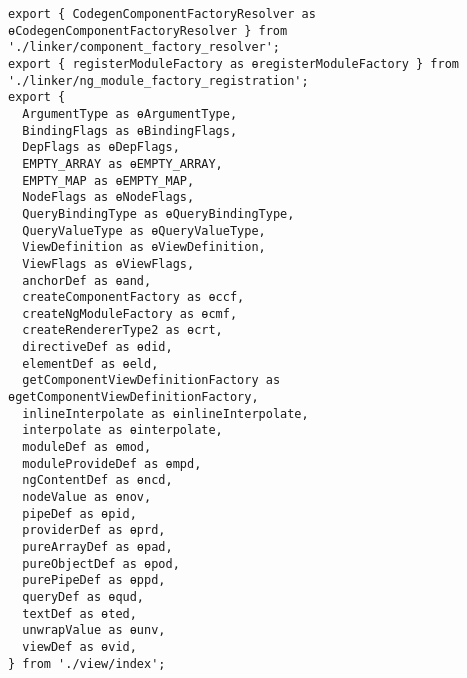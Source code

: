 \begin{verbatim}
export { CodegenComponentFactoryResolver as ɵCodegenComponentFactoryResolver } from './linker/component_factory_resolver';
export { registerModuleFactory as ɵregisterModuleFactory } from './linker/ng_module_factory_registration';
export {
  ArgumentType as ɵArgumentType,
  BindingFlags as ɵBindingFlags,
  DepFlags as ɵDepFlags,
  EMPTY_ARRAY as ɵEMPTY_ARRAY,
  EMPTY_MAP as ɵEMPTY_MAP,
  NodeFlags as ɵNodeFlags,
  QueryBindingType as ɵQueryBindingType,
  QueryValueType as ɵQueryValueType,
  ViewDefinition as ɵViewDefinition,
  ViewFlags as ɵViewFlags,
  anchorDef as ɵand,
  createComponentFactory as ɵccf,
  createNgModuleFactory as ɵcmf,
  createRendererType2 as ɵcrt,
  directiveDef as ɵdid,
  elementDef as ɵeld,
  getComponentViewDefinitionFactory as ɵgetComponentViewDefinitionFactory,
  inlineInterpolate as ɵinlineInterpolate,
  interpolate as ɵinterpolate,
  moduleDef as ɵmod,
  moduleProvideDef as ɵmpd,
  ngContentDef as ɵncd,
  nodeValue as ɵnov,
  pipeDef as ɵpid,
  providerDef as ɵprd,
  pureArrayDef as ɵpad,
  pureObjectDef as ɵpod,
  purePipeDef as ɵppd,
  queryDef as ɵqud,
  textDef as ɵted,
  unwrapValue as ɵunv,
  viewDef as ɵvid,
} from './view/index';
\end{verbatim}
